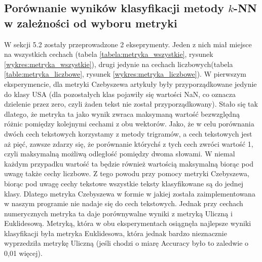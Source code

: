 \documentclass{classrep}
\begin{document}
\subsection{Porównanie wyników klasyfikacji metody $k$-NN w zależności od wyboru metryki}
W sekcji 5.2 zostały przeprowadzone 2 ekseprymenty. Jeden z nich miał miejsce na wszystkich cechach (tabela \ref{tabela:metryka_wszystkie}, rysunek \ref{wykres:metryka_wszystkie}), drugi jedynie na cechach liczbowych(tabela \ref{table:metryka_liczbowe}, rysunek \ref{wykres:metryka_liczbowe}). W pierwszym eksperymencie, dla metryki Czebyszewa artykuły były przyporządkowane jedynie do klasy USA (dla pozostałych klas pojawiły się wartości NaN, co oznacza dzielenie przez zero, czyli żaden tekst nie został przyporządkowany). Stało się tak dlatego, że metryka ta jako wynik zwraca maksymaną wartość bezwzględną różnic pomiędzy kolejnymi cechami z obu wektorów. Jako, że w celu porównania dwóch cech tekstowych korzystamy z metody trigramów, a cech tekstowych jest aż pięć, zawsze zdarzy się, że porównanie którychś z tych cech zwróci wartość 1, czyli maksymalną możliwą odległość pomiędzy dwoma słowami. W niemal każdym przypadku wartość ta będzie również wartością maksymalną biorąc pod uwagę także cechy liczbowe. Z tego powodu przy pomocy metryki Czebyszewa, biorąc pod uwagę cechy tekstowe wszystkie teksty klasyfikowane są do jednej klasy. Dlatego metryka Czebyszewa w formie w jakiej została zaimplementowana w naszym programie nie nadaje się do cech tekstowych. Jednak przy cechach numerycznych metryka ta daje porównywalne wyniki z metryką Uliczną i Euklidesową. Metryką, która w obu eksperymentach osiągnęła najlepsze wyniki klasyfikacji była metryka Euklidesowa, która jednak bardzo nieznacznie wyprzedziła metrykę Uliczną (jeśli chodzi o miarę Accuracy było to zaledwie o 0,01 więcej).
\end{document}
